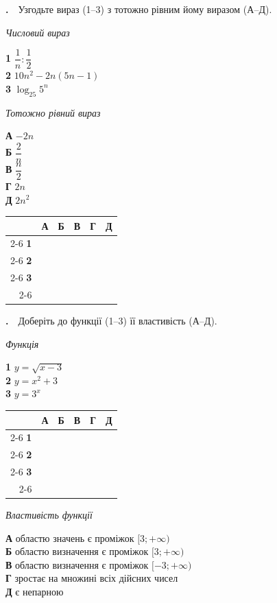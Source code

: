 \documentclass[12pt]{article}
\newcommand{\matchingGrid}{%
    \begingroup
    \renewcommand{\arraystretch}{1.15}
    \setlength{\tabcolsep}{4pt}
    \footnotesize
    \begin{tabular}{r|c|c|c|c|c|}
         \multicolumn{1}{c}{} & \multicolumn{1}{c}{\textbf{А}} & \multicolumn{1}{c}{\textbf{Б}} & \multicolumn{1}{c}{\textbf{В}} & \multicolumn{1}{c}{\textbf{Г}} & \multicolumn{1}{c}{\textbf{Д}} \\ \cline{2-6}
         \textbf{1} & \phantom{X} & \phantom{X} & \phantom{X} & \phantom{X} & \phantom{X} \\ \cline{2-6}
         \textbf{2} & & & & & \\ \cline{2-6}
         \textbf{3} & & & & & \\ \cline{2-6}
    \end{tabular}
    \endgroup
}
\newcounter{zad}
\newcommand{\zadtask}[1]{\stepcounter{zad}\par\vspace{0.3cm}\noindent\textbf{\thezad.}\ \ #1\par\vspace{0.2cm}}
\begin{document}
\zadtask{Узгодьте вираз (1--3) з тотожно рівним йому виразом (А--Д).\par
\vspace{0.3cm}
\noindent
\begin{minipage}[t]{0.45\textwidth}
\textit{Числовий вираз}\par\vspace{0.15cm}
\textbf{1} \quad $\dfrac{1}{n} : \dfrac{1}{2}$\\[0.3cm]
\textbf{2} \quad $10n^2 - 2n(5n - 1)$\\[0.3cm]
\textbf{3} \quad $\log_{25} 5^n$
\end{minipage}%
\hfill
\begin{minipage}[t]{0.3\textwidth}
\textit{Тотожно рівний вираз}\par\vspace{0.15cm}
\textbf{А} \quad $-2n$\\[0.15cm]
\textbf{Б} \quad $\dfrac{2}{n}$\\[0.15cm]
\textbf{В} \quad $\dfrac{n}{2}$\\[0.15cm]
\textbf{Г} \quad $2n$\\[0.15cm]
\textbf{Д} \quad $2n^2$
\end{minipage}%
\hfill
\begin{minipage}[t]{0.2\textwidth}
\vspace{0.4cm}
\begin{flushright}\matchingGrid\end{flushright}
\end{minipage}}

\zadtask{Доберіть до функції (1--3) її властивість (А--Д).\par
\vspace{0.3cm}
\noindent
\begin{minipage}[t]{0.30\textwidth}
\textit{Функція}\par\vspace{0.2cm}
\textbf{1} \quad $y = \sqrt{x - 3}$\\[0.25cm]
\textbf{2} \quad $y = x^2 + 3$\\[0.25cm]
\textbf{3} \quad $y = 3^x$
\par\vspace{0.4cm}
\matchingGrid
\end{minipage}%
\hfill
\begin{minipage}[t]{0.66\textwidth}
\textit{Властивість функції}\par\vspace{0.2cm}
\textbf{А} \quad областю значень є проміжок $[3; +\infty)$\\[0.15cm]
\textbf{Б} \quad областю визначення є проміжок $[3; +\infty)$\\[0.15cm]
\textbf{В} \quad областю визначення є проміжок $[-3; +\infty)$\\[0.15cm]
\textbf{Г} \quad зростає на множині всіх дійсних чисел\\[0.15cm]
\textbf{Д} \quad є непарною
\end{minipage}}
\end{document}
